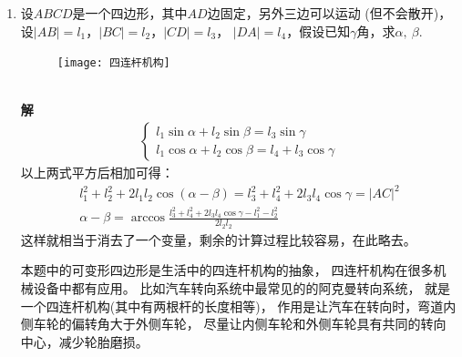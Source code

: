 \begin{enumerate}[label={【\textbf{例\thechapter.\arabic*}】},
 leftmargin=\inteval{\myenumleftmargin}pt,
 itemsep=\inteval{\myenumitempsep}pt,
 itemindent=\inteval{\myenumitemindent}pt]
这种设计方案被称为“曲轴偏置”(分为正偏置与负偏置)，正偏置的优点有
\footnote{$\diamond$ 顾丽，吴东兴，李波，等. 曲轴偏置和活塞销偏置对发动机摩擦损耗的影响研究[J]. 现代车用动力, 2018(3):3.\\
$\diamond$ 田丰果，睢娟. 曲轴偏置式发动机力学分析研究[J]. 数字技术与应用, 2009. \\
$\diamond$李永纯，张颖，袁海马.某型号发动机曲轴偏置分析.汽车工程师.(2014):44-46}：
在做功冲程中，连杆与气缸中心轴的夹角更小，
使发动机输出的扭矩和功率和热效率提高。同时可减小活塞环对气缸壁的正压力，从而减小摩擦力。

如果假设曲轴匀速旋转，即$ \theta=\omega t $，那么将$ x $对时间$ t $
求一阶导数和二阶导数，就能得到活塞往复运动的速度和加速度的变化规律。分析$ x $
的极大、极小值，就能得到活塞的行程，感兴趣的读者自行研究。

\item 设$ ABCD $是一个四边形，其中$ AD $边固定，另外三边可以运动
(但不会散开)，设$ |AB|=l_1 $，$ |BC|=l_2 $，$ |CD|=l_3 $，
$ |DA|=l_4 $，假设已知$ \gamma $角，求$ \alpha,\ \beta $.
\begin{figure}[h]
\centering
\texttt{[image: 四连杆机构]}
\end{figure} \\
\textbf{解}\ 
\begin{align*}
\begin{cases}
    l_1\sin\alpha +l_2\sin\beta=l_3\sin\gamma \\
    l_1\cos\alpha +l_2\cos\beta=l_4+l_3\cos\gamma 
\end{cases}
\end{align*}
以上两式平方后相加可得：
\begin{gather*}
l_1^2+l_2^2+2l_1l_2\cos(\alpha-\beta)=
l_3^2+l_4^2+2l_3l_4\cos\gamma =|AC|^2 \\
\alpha-\beta=\arccos\frac{l_3^2+l_4^2+2l_3l_4\cos\gamma-
    l_1^2-l_2^2}{2l_2l_2}
\end{gather*}
这样就相当于消去了一个变量，剩余的计算过程比较容易，在此略去。

本题中的可变形四边形是生活中的四连杆机构的抽象，
四连杆机构在很多机械设备中都有应用。
比如汽车转向系统中最常见的的阿克曼转向系统，
就是一个四连杆机构(其中有两根杆的长度相等)，
作用是让汽车在转向时，弯道内侧车轮的偏转角大于外侧车轮，
尽量让内侧车轮和外侧车轮具有共同的转向中心，减少轮胎磨损。


\end{enumerate}
